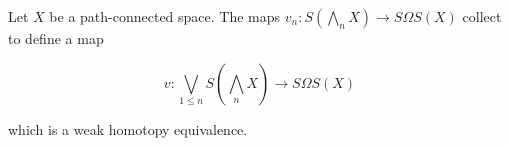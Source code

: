 Let $X$ be a path-connected space. The maps $v_n: S(\bigwedge_n X) \rightarrow S\Omega S(X)$ collect to define a map

$$v: \bigvee_{1 \leq n} S(\bigwedge_n X) \rightarrow S\Omega S(X)$$

which is a weak homotopy equivalence.
